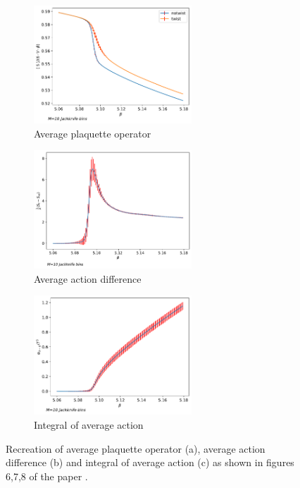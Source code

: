 \documentclass[english,twoside,openright]{UH_TCM_MSc}
\begin{document}
\begin{figure}[htpb]
    \centering
    \begin{subfigure}[t]{\textwidth}
        \centering
        \includegraphics[width=0.65\textwidth]{final_plots/su3_recreate/action.pdf}
        \caption{Average plaquette operator}
        \label{fig:recrete-action}
    \end{subfigure}
    \begin{subfigure}[t]{\textwidth}
        \centering  
        \includegraphics[width=0.65\textwidth]{final_plots/su3_recreate/action_diff.pdf}
        \caption{Average action difference}
        \label{fig:recrete-difference}
    \end{subfigure}
    \begin{subfigure}[t]{\textwidth}
        \centering
        \includegraphics[width=0.65\textwidth]{final_plots/su3_recreate/action_diff_int.pdf}
        \caption{Integral of average action}
        \label{fig:recrete-integral}
    \end{subfigure}
    \caption{Recreation of average plaquette operator (a), average action difference (b) and integral of average action (c) as shown in figures 6,7,8 of the paper \cite{twist}.}
    \label{fig:su3-recreation}
\end{figure}
\end{document}
